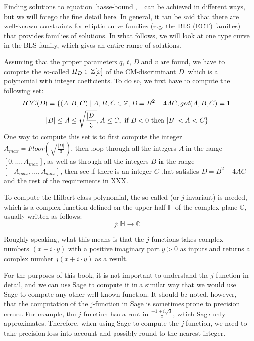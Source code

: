 Finding solutions to equation \ref{hasse-bound},= can be achieved in different ways, but we will forego the fine detail here. In general, it can be said that there are well-known constraints for elliptic curve families (e.g. the BLS (ECT) families) that provides families of solutions. In what follows, we will look at one type curve in the BLS-family, which gives an entire range of solutions.

Assuming that the proper parameters $q$, $t$, $D$ and $v$ are found, we have to compute the so-called  $H_D\in \mathbb{Z}[x]$ of the CM-discriminant $D$, which is a polynomial with integer coefficients. To do so, we first have to compute the following set:
\begin{multline*}
ICG(D)=\{(A,B,C)\;|\; A,B,C\in\mathbb{Z}, D = B^2-4AC, gcd(A,B,C)=1, \\
|B|\leq A \leq \sqrt{\frac{|D|}{3}}, A\leq C, 
\text{ if } B< 0 \text{ then } |B| < A < C\}
\end{multline*} 
One way to compute this set is to first compute the integer $A_{max}= Floor(\sqrt{\frac{|D|}{3}})$, then loop through all the integers $A$ in the range $[0,\ldots,A_{max}]$, as well as through all the integers $B$ in the range $[-A_{max},\ldots,A_{max}]$, then see if there is an integer $C$ that satisfies $D = B^2-4AC$ and the rest of the requirements in XXX.

To compute the Hilbert class polynomial, the so-called  (or $j$-invariant) is needed, which is a complex function defined on the upper half $\mathbb{H}$ of the complex plane $\mathbb{C}$, usually written as follows:
\begin{equation}\label{eq:j-invariant2}
j: \mathbb{H} \to \mathbb{C}
\end{equation}

Roughly speaking, what this means is that the $j$-functions takes complex numbers 
$(x +i\cdot y)$ with a positive imaginary part $y>0$ as inputs and returns a complex number $j(x+i\cdot y)$ as a result.

For the purposes of this book, it is not important to understand the $j$-function in detail, and we can use Sage to compute it in a similar way that we would use Sage to compute any other well-known function. It should be noted, however, that the computation of the $j$-function in Sage is sometimes prone to precision errors. For example, the $j$-function has a root in $\frac{-1+i\sqrt{3}}{2}$, which Sage only approximates. Therefore, when using Sage to compute the $j$-function, we need to take precision loss into account and possibly round to the nearest integer.

